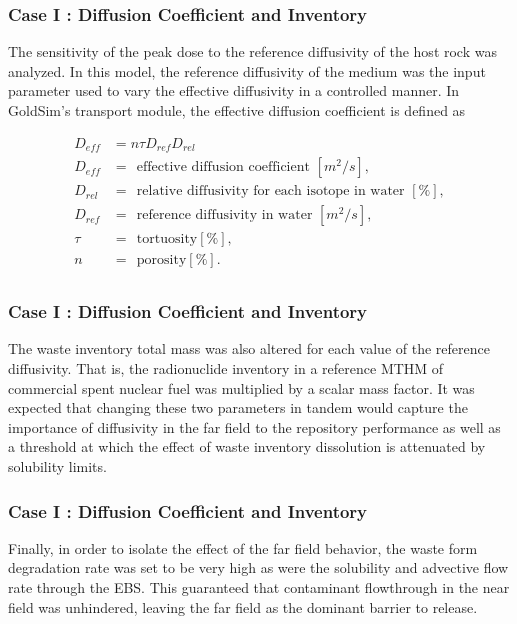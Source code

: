 
\begin{frame}[c]
  \frametitle{Case I : Diffusion Coefficient and Inventory}
The sensitivity of the peak dose to the reference diffusivity of the 
host rock was analyzed.  In this model, the reference diffusivity of the medium 
was the input parameter used to vary the effective diffusivity in a controlled 
manner. In GoldSim's transport module, the effective diffusion coefficient is 
defined as 

\begin{align}\label{diffcoeff}
  D_{eff} &= n\tau D_{ref}D_{rel} \\ %
       D_{eff} &= ~~\mbox{effective diffusion coefficient }[m^2/s],\nonumber\\
       D_{rel} &= ~~\mbox{relative diffusivity for each isotope in water }[\%],\nonumber\\
       D_{ref} &= ~~\mbox{reference diffusivity in water }[m^2/s],\nonumber\\
       \tau &= ~~\mbox{tortuosity} [\%], \nonumber \\ 
       n &= ~~\mbox{porosity}[\%].\nonumber\\
  \label{GDSEdiff}
\end{align}
\end{frame}

\begin{frame}[c]
  \frametitle{Case I : Diffusion Coefficient and Inventory}
The waste inventory total mass was also altered for each value of the reference 
diffusivity.  That is, the radionuclide inventory in a reference 
\gls{MTHM} of commercial spent nuclear fuel was multiplied by a scalar mass factor.  
It was expected that changing these two parameters in tandem would capture the 
importance of diffusivity in the far field to the repository performance 
as well as a threshold at which the effect of waste inventory dissolution is 
attenuated by solubility limits.
\end{frame}

\begin{frame}[c]
  \frametitle{Case I : Diffusion Coefficient and Inventory}
Finally, in order to isolate the effect of the far field behavior, the waste form 
degradation rate was set to be very high as were the solubility and advective 
flow rate through the  \gls{EBS}. This guaranteed that contaminant flowthrough 
in the near field was unhindered, leaving the far field as the dominant barrier 
to release.
\end{frame}


